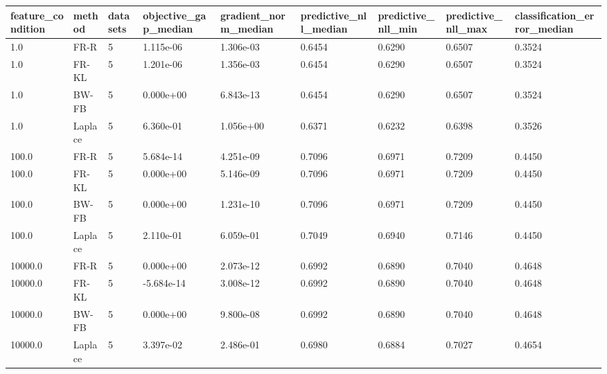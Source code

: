 \begin{tabular}{lllllllll}
\toprule
feature\_condition & method & datasets & objective\_gap\_median & gradient\_norm\_median & predictive\_nll\_median & predictive\_nll\_min & predictive\_nll\_max & classification\_error\_median \\
\midrule
1.0 & FR-R & 5 & 1.115e-06 & 1.306e-03 & 0.6454 & 0.6290 & 0.6507 & 0.3524 \\
1.0 & FR-KL & 5 & 1.201e-06 & 1.356e-03 & 0.6454 & 0.6290 & 0.6507 & 0.3524 \\
1.0 & BW-FB & 5 & 0.000e+00 & 6.843e-13 & 0.6454 & 0.6290 & 0.6507 & 0.3524 \\
1.0 & Laplace & 5 & 6.360e-01 & 1.056e+00 & 0.6371 & 0.6232 & 0.6398 & 0.3526 \\
100.0 & FR-R & 5 & 5.684e-14 & 4.251e-09 & 0.7096 & 0.6971 & 0.7209 & 0.4450 \\
100.0 & FR-KL & 5 & 0.000e+00 & 5.146e-09 & 0.7096 & 0.6971 & 0.7209 & 0.4450 \\
100.0 & BW-FB & 5 & 0.000e+00 & 1.231e-10 & 0.7096 & 0.6971 & 0.7209 & 0.4450 \\
100.0 & Laplace & 5 & 2.110e-01 & 6.059e-01 & 0.7049 & 0.6940 & 0.7146 & 0.4450 \\
10000.0 & FR-R & 5 & 0.000e+00 & 2.073e-12 & 0.6992 & 0.6890 & 0.7040 & 0.4648 \\
10000.0 & FR-KL & 5 & -5.684e-14 & 3.008e-12 & 0.6992 & 0.6890 & 0.7040 & 0.4648 \\
10000.0 & BW-FB & 5 & 0.000e+00 & 9.800e-08 & 0.6992 & 0.6890 & 0.7040 & 0.4648 \\
10000.0 & Laplace & 5 & 3.397e-02 & 2.486e-01 & 0.6980 & 0.6884 & 0.7027 & 0.4654 \\
\bottomrule
\end{tabular}
